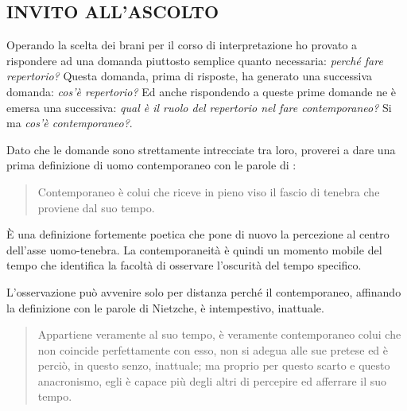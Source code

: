 
\begin{refsection}

\chapter{INVITO ALL'ASCOLTO}
\startcontents[chapters]



Operando la scelta dei brani per il corso di interpretazione ho provato a
rispondere ad una domanda piuttosto semplice quanto necessaria: \emph{perché
fare repertorio?} Questa domanda, prima di risposte, ha generato una successiva
domanda: \emph{cos'è repertorio?} Ed anche rispondendo a queste prime domande ne
è emersa una successiva: \emph{qual è il ruolo del repertorio nel fare
contemporaneo?} Si ma \emph{cos'è contemporaneo?}.


Dato che le domande sono strettamente intrecciate tra loro, proverei a dare una
prima definizione di uomo contemporaneo con le parole di \ga:

\begin{quote}
	Contemporaneo è colui che riceve in pieno viso il fascio di tenebra che proviene
	dal suo tempo.
\end{quote}

È una definizione fortemente poetica che pone di nuovo la percezione al centro
dell'asse uomo-tenebra. La contemporaneità è quindi un momento mobile del tempo
che identifica la facoltà di osservare l'oscurità del tempo specifico.

L'osservazione può avvenire solo per distanza perché il contemporaneo, affinando
la definizione con le parole di Nietzche, è intempestivo, inattuale.

\begin{quote}
	Appartiene veramente al suo tempo, è veramente contemporaneo colui che non
	coincide perfettamente con esso, non si adegua alle sue pretese ed è perciò,
	in questo senzo, inattuale; ma proprio per questo scarto e questo anacronismo,
	egli è capace pi\`u degli altri di percepire ed afferrare il suo tempo.
\end{quote}


\end{refsection}
